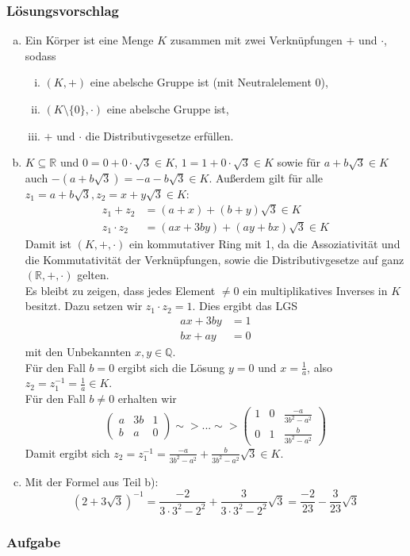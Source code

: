 \documentclass[a4paper,11pt]{scrartcl}
\newcounter{auf}
\newcommand{\Aufgabe}%
        {\addtocounter{auf}{1} \subsubsection*{\rmfamily  Aufgabe \theauf \hspace{1em}} }
\newcommand{\RR}{\mathbb{R}}
\newcommand{\Q}{\mathbb{Q}}
\begin{document}
\subsubsection*{Lösungsvorschlag}
\begin{enumerate}[a)]

\item Ein Körper ist eine Menge $K$ zusammen mit zwei Verknüpfungen $+$ und $\cdot$, sodass
\begin{enumerate}[i)]
\item $(K,+)$ eine abelsche Gruppe ist (mit Neutralelement $0$),
\item $(K\setminus\{0\},\cdot)$ eine abelsche Gruppe ist,
\item $+$ und $\cdot$ die Distributivgesetze erfüllen.
\end{enumerate}

\item $K \subseteq \RR$ und $0=0+0 \cdot \sqrt{3} \in K$, $1=1+0 \cdot \sqrt{3} \in K$ sowie für $a+b \sqrt{3} \in K$ auch $-(a+b \sqrt{3})=-a-b\sqrt{3} \in K$. Außerdem gilt für alle $z_1=a+b\sqrt{3}, z_2=x+y\sqrt{3} \in K$:
\begin{align*}
z_1+z_2&=(a+x)+(b+y)\sqrt{3}\in K\\
z_1\cdot z_2&=(ax+3by)+(ay+bx)\sqrt{3} \in K
\end{align*}
Damit ist $(K,+,\cdot)$ ein kommutativer Ring mit 1, da die Assoziativität und die Kommutativität der Verknüpfungen, sowie die Distributivgesetze auf ganz $(\RR,+,\cdot)$ gelten.\\
Es bleibt zu zeigen, dass jedes Element $\ne 0$ ein multiplikatives Inverses in $K$ besitzt. Dazu setzen wir $z_1\cdot z_2=1$. Dies ergibt das LGS
\begin{align*}
ax+3by&=1\\
bx+ay&=0
\end{align*}
mit den Unbekannten $x, y \in \Q$.\\
Für den Fall $b=0$ ergibt sich die Lösung $y=0$ und $x=\frac{1}{a}$, also $z_2=z_1^{-1}=\frac{1}{a} \in K$.\\
Für den Fall $b\ne 0$ erhalten wir
$$
\left( \begin{array}{cc|c} a& 3b&1\\b&a&0 \end{array}\right) \sim> ... \sim> \left( \begin{array}{cc|c}1&0&\frac{-a}{3b^2-a^2}\\  0&1&\frac{b}{3b^2-a^2}\end{array}\right) 
$$
Damit ergibt sich $z_2=z_1^{-1}=\frac{-a}{3b^2-a^2}+\frac{b}{3b^2-a^2}\sqrt{3} \in K$.
\item Mit der Formel aus Teil b):
$$
(2+3\sqrt{3})^{-1}=\frac{-2}{3\cdot 3^2 - 2^2}+\frac{3}{3\cdot 3^2 - 2^2}\sqrt{3}=\frac{-2}{23}-\frac{3}{23}\sqrt{3}
$$

\end{enumerate}
\newpage
\Aufgabe
\end{document}
